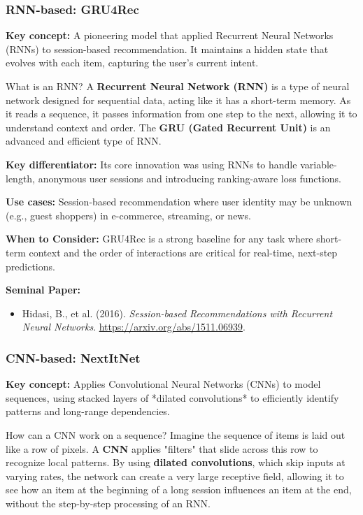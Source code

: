 \documentclass{article}
\begin{document}
    \subsubsection{RNN-based: GRU4Rec}
\noindent\textbf{Key concept:} A pioneering model that applied Recurrent Neural Networks (RNNs) to session-based recommendation. It maintains a hidden state that evolves with each item, capturing the user's current intent.
    
    \begin{asidebox}{What is an RNN?}
    A \textbf{Recurrent Neural Network (RNN)} is a type of neural network designed for sequential data, acting like it has a short-term memory. As it reads a sequence, it passes information from one step to the next, allowing it to understand context and order. The \textbf{GRU (Gated Recurrent Unit)} is an advanced and efficient type of RNN.
    \end{asidebox}

\noindent\textbf{Key differentiator:} Its core innovation was using RNNs to handle variable-length, anonymous user sessions and introducing ranking-aware loss functions.

\noindent\textbf{Use cases:} Session-based recommendation where user identity may be unknown (e.g., guest shoppers) in e-commerce, streaming, or news.

\noindent\textbf{When to Consider:} GRU4Rec is a strong baseline for any task where short-term context and the order of interactions are critical for real-time, next-step predictions.

\noindent\textbf{Seminal Paper:}
    \begin{itemize}
        \item Hidasi, B., et al. (2016). \textit{Session-based Recommendations with Recurrent Neural Networks}. \url{https://arxiv.org/abs/1511.06939}.
    \end{itemize}

    \subsubsection{CNN-based: NextItNet}
\noindent\textbf{Key concept:} Applies Convolutional Neural Networks (CNNs) to model sequences, using stacked layers of *dilated convolutions* to efficiently identify patterns and long-range dependencies.
    
    \begin{asidebox}{How can a CNN work on a sequence?}
    Imagine the sequence of items is laid out like a row of pixels. A \textbf{CNN} applies "filters" that slide across this row to recognize local patterns. By using \textbf{dilated convolutions}, which skip inputs at varying rates, the network can create a very large receptive field, allowing it to see how an item at the beginning of a long session influences an item at the end, without the step-by-step processing of an RNN.
    \end{asidebox}
\end{document}
